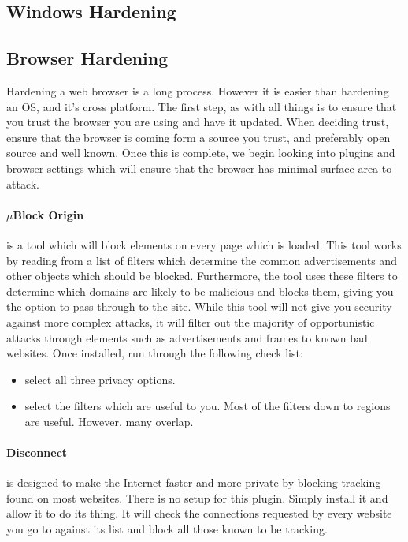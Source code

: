 \documentclass[a4paper,11pt]{article}
\begin{document}
	\subsection{Windows Hardening}
	\subsection{Browser Hardening}
		\newpage Hardening a web browser is a long process. However it is easier than hardening an OS, and it's cross platform. 
		The first step, as with all things is to ensure that you trust the browser you are using and have it updated. 
		When deciding trust, ensure that the browser is coming form a source you trust, and preferably open source and well known. 
		Once this is complete, we begin looking into plugins and browser settings which will ensure that the browser has minimal surface area to attack. 
		\paragraph{$\mu{}$Block Origin}
			is a tool which will block elements on every page which is loaded. 
			This tool works by reading from a list of filters which determine the common advertisements and other objects which should be blocked. 
			Furthermore, the tool uses these filters to determine which domains are likely to be malicious and blocks them, giving you the option to pass through to the site. 
			While this tool will not give you security against more complex attacks, it will filter out the majority of opportunistic attacks through elements such as advertisements and frames to known bad websites. 
			Once installed, run through the following check list: 
			\begin{itemize}
				\item select all three privacy options.
				\item select the filters which are useful to you. 
					Most of the filters down to regions are useful. However, many overlap. 
			\end{itemize}
		\paragraph{Disconnect}
			is designed to make the Internet faster and more private by blocking tracking found on most websites. 
			There is no setup for this plugin. Simply install it and allow it to do its thing. 
			It will check the connections requested by every website you go to against its list and block all those known to be tracking. 
\end{document}
